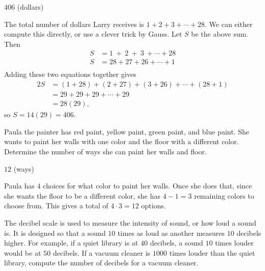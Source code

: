 \documentclass[11pt]{article}
\begin{document}
\begin{answer}
$\boxed{406}$ (dollars)
\end{answer}

\begin{solution}
The total number of dollars Larry receives is $1 + 2 + 3 + \cdots + 28$. We can either compute
this directly, or use a clever trick by Gauss. Let $S$ be the above sum. Then
\begin{align*}
S &= 1\ +\ 2\ +\ 3\ + \cdots + 28 \\
S &= 28 + 27 + 26 + \cdots + 1 \\
\end{align*}
Adding these two equations together gives
\begin{align*}
2S &= (1+28) + (2+27) + (3+26) + \cdots + (28+1) \\
&= 29 + 29 + 29 + \cdots + 29 \\
&= 28(29),
\end{align*}
so $S = 14(29) = \boxed{406}$.
\end{solution}


\begin{problem}
Paula the painter has red paint, yellow paint, green paint, and blue paint.
She wants to paint her walls with one color and the floor with a different color.
Determine the number of ways she can paint her walls and floor.
\end{problem}

\begin{answer}
$\boxed{12}$ (ways)
\end{answer}

\begin{solution}
Paula has $4$ choices for what color to paint her walls. Once she does that,
since she wants the floor to be a different color, she has $4-1 = 3$ remaining colors
to choose from. This gives a total of $4 \cdot 3 = \boxed{12}$ options.
\end{solution}


\begin{problem}
The decibel scale is used to measure the intensity of sound, or how loud a sound is.
It is designed so that a sound $10$ times as loud as another measures $10$ decibels higher.
For example, if a quiet library is at $40$ decibels, a sound $10$ times louder would be 
at $50$ decibels. If a vacuum cleaner is $1000$ times louder than the quiet library, 
compute the number of decibels for a vacuum cleaner.
\end{problem}
\end{document}
